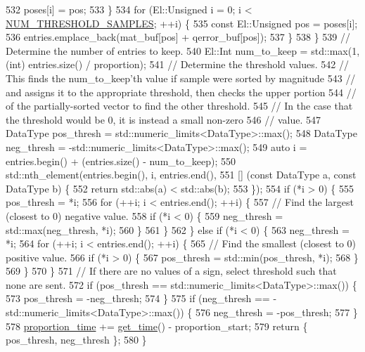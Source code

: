 \begin{DoxyCode}
532       poses[i] = pos;
533     \}
534     \textcolor{keywordflow}{for} (El::Unsigned i = 0; i < \hyperlink{classlbann_1_1lbann__quantizer_a7745dbc282bebe812ff5523a4b3df3f2}{NUM\_THRESHOLD\_SAMPLES}; ++i) \{
535       \textcolor{keyword}{const} El::Unsigned pos = poses[i];
536       entries.emplace\_back(mat\_buf[pos] + qerror\_buf[pos]);
537     \}
538   \}
539   \textcolor{comment}{// Determine the number of entries to keep.}
540   El::Int num\_to\_keep = std::max(1, (\textcolor{keywordtype}{int}) entries.size() / proportion);
541   \textcolor{comment}{// Determine the threshold values.}
542   \textcolor{comment}{// This finds the num\_to\_keep'th value if sample were sorted by magnitude}
543   \textcolor{comment}{// and assigns it to the appropriate threshold, then checks the upper portion}
544   \textcolor{comment}{// of the partially-sorted vector to find the other threshold.}
545   \textcolor{comment}{// In the case that the threshold would be 0, it is instead a small non-zero}
546   \textcolor{comment}{// value.}
547   DataType pos\_thresh = std::numeric\_limits<DataType>::max();
548   DataType neg\_thresh = -std::numeric\_limits<DataType>::max();
549   \textcolor{keyword}{auto} i = entries.begin() + (entries.size() - num\_to\_keep);
550   std::nth\_element(entries.begin(), i, entries.end(),
551   [] (\textcolor{keyword}{const} DataType a, \textcolor{keyword}{const} DataType b) \{
552     \textcolor{keywordflow}{return} std::abs(a) < std::abs(b);
553   \});
554   \textcolor{keywordflow}{if} (*i > 0) \{
555     pos\_thresh = *i;
556     \textcolor{keywordflow}{for} (++i; i < entries.end(); ++i) \{
557       \textcolor{comment}{// Find the largest (closest to 0) negative value.}
558       \textcolor{keywordflow}{if} (*i < 0) \{
559         neg\_thresh = std::max(neg\_thresh, *i);
560       \}
561     \}
562   \} \textcolor{keywordflow}{else} \textcolor{keywordflow}{if} (*i < 0) \{
563     neg\_thresh = *i;
564     \textcolor{keywordflow}{for} (++i; i < entries.end(); ++i) \{
565       \textcolor{comment}{// Find the smallest (closest to 0) positive value.}
566       \textcolor{keywordflow}{if} (*i > 0) \{
567         pos\_thresh = std::min(pos\_thresh, *i);
568       \}
569     \}
570   \}
571   \textcolor{comment}{// If there are no values of a sign, select threshold such that none are sent.}
572   \textcolor{keywordflow}{if} (pos\_thresh == std::numeric\_limits<DataType>::max()) \{
573     pos\_thresh = -neg\_thresh;
574   \}
575   \textcolor{keywordflow}{if} (neg\_thresh == -std::numeric\_limits<DataType>::max()) \{
576     neg\_thresh = -pos\_thresh;
577   \}
578   \hyperlink{classlbann_1_1lbann__quantizer_a6bd266728f578df0c86fc2e493742cc1}{proportion\_time} += \hyperlink{namespacelbann_a478d36031ff0659893c4322cd856157f}{get\_time}() - proportion\_start;
579   \textcolor{keywordflow}{return} \{ pos\_thresh, neg\_thresh \};
580 \}
\end{DoxyCode}
